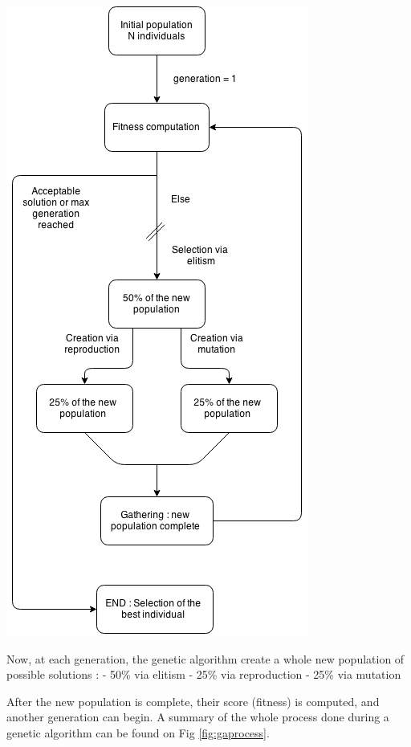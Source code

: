 \documentclass{report}
\begin{document}
	\vspace{0.5cm}
	\begin{center}
		\includegraphics[scale=0.5]{ressources/ag3}	
		\label{fig:gaprocess}
	\end{center}
	\vspace{1cm}
	
	Now, at each generation, the genetic algorithm create a whole new population of possible solutions :
	- 50\% via elitism
	- 25\% via reproduction
	- 25\% via mutation
	
	After the new population is complete, their score (fitness) is computed, and another generation can begin. A summary of the whole process done during a genetic algorithm can be found on Fig \ref{fig:gaprocess}.
	
\end{document}

